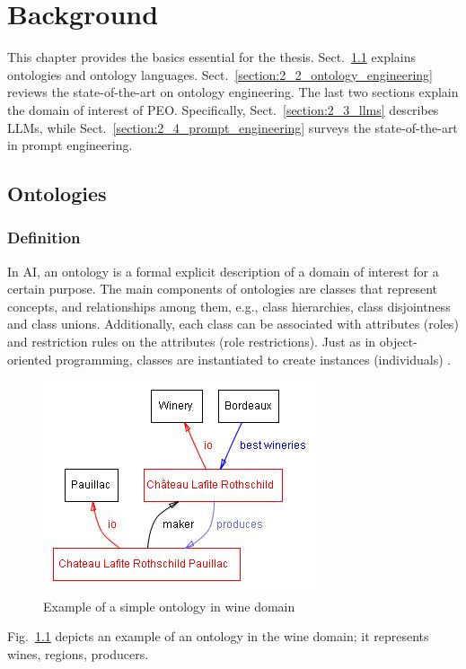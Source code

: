 \chapter{Background}
\label{chapter:2_background}
This chapter provides the basics essential for the thesis.
Sect.~\ref{section:2_1_ontologies} explains ontologies and ontology languages.
Sect.~\ref{section:2_2_ontology_engineering} reviews the state-of-the-art on ontology engineering.
The last two sections explain the domain of interest of PEO.
Specifically, Sect.~\ref{section:2_3_llms} describes LLMs, while Sect.~\ref{section:2_4_prompt_engineering} surveys the state-of-the-art in prompt engineering.

\section{Ontologies}
\label{section:2_1_ontologies}
\subsection{Definition}
In AI, an ontology is a formal explicit description of a domain of interest for a certain purpose.
The main components of ontologies are classes that represent concepts, and relationships among them, e.g., class hierarchies, class disjointness and class unions.
Additionally, each class can be associated with attributes (roles) and restriction rules on the attributes (role restrictions).
Just as in object-oriented programming, classes are instantiated to create instances (individuals) \cite{protege_ontology}.

\begin{figure}[H]
    \centering
    \includegraphics[width=0.5\linewidth]{Figures/fig_0.jpg}
    \caption{Example of a simple ontology in wine domain}
    \label{fig:wine_ontology}
\end{figure}
Fig.~\ref{fig:wine_ontology} depicts an example of an ontology in the wine domain; it represents wines, regions, producers.

